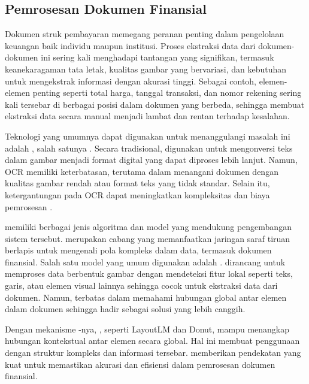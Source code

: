 \subsection{Pemrosesan Dokumen Finansial}
\label{subsec:pemrosesan-dokumen-finansial}

Dokumen struk pembayaran memegang peranan penting dalam pengelolaan
keuangan baik individu maupun institusi. Proses ekstraksi data dari dokumen-dokumen ini sering kali menghadapi tantangan yang signifikan, termasuk keanekaragaman tata letak, kualitas gambar yang bervariasi, dan kebutuhan untuk
mengekstrak informasi dengan akurasi tinggi. Sebagai contoh, elemen-elemen penting seperti total harga, tanggal transaksi, dan nomor rekening sering kali tersebar di berbagai posisi dalam dokumen yang berbeda, sehingga membuat ekstraksi data secara manual menjadi lambat dan rentan terhadap kesalahan.

Teknologi yang umumnya dapat digunakan untuk menanggulangi masalah ini adalah \cv{}, salah satunya \ocr. Secara tradisional, \ocr{} digunakan untuk mengonversi teks dalam gambar menjadi format digital yang dapat diproses lebih lanjut. Namun, OCR memiliki
keterbatasan, terutama dalam menangani dokumen dengan kualitas gambar rendah atau format teks yang tidak standar. Selain itu, ketergantungan pada OCR dapat meningkatkan kompleksitas dan biaya pemrosesan \parencite{kim2021donut}.

\dlfl{} memiliki berbagai jenis algoritma dan model yang mendukung pengembangan sistem tersebut. \dl{} merupakan cabang \ml{} yang memanfaatkan jaringan saraf tiruan berlapis untuk mengenali pola kompleks dalam data, termasuk dokumen finansial. Salah satu model yang umum digunakan adalah \cnn. \cnn{} dirancang untuk memproses data berbentuk gambar dengan mendeteksi fitur lokal seperti teks, garis, atau elemen visual lainnya sehingga cocok untuk ekstraksi data dari dokumen. Namun, \cnn{} terbatas dalam memahami hubungan global antar
elemen dalam dokumen sehingga \transformer{} hadir sebagai solusi yang lebih canggih. \parencite{alzubaidi2021review}

Dengan mekanisme \attention-nya, \transformer{}, seperti LayoutLM dan
Donut, mampu menangkap hubungan kontekstual antar elemen secara global. Hal ini membuat penggunaan \transformer{} dengan struktur kompleks dan informasi
tersebar. \transformer{} memberikan pendekatan yang kuat untuk memastikan akurasi dan efisiensi dalam pemrosesan dokumen finansial.